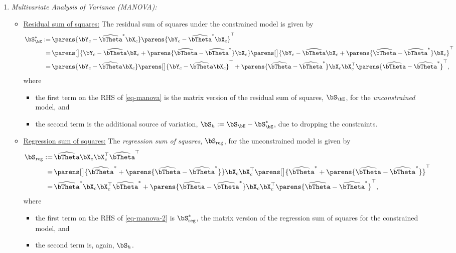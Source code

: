 \documentclass[12pt]{article}
\begin{document}
\begin{enumerate}[label=\textbf{\arabic*.}]
\begin{enumerate}
		\item \textit{Multivariate Analysis of Variance (MANOVA):} 
		\begin{itemize}
			\item \underline{Residual sum of squares:} The residual sum of squares under the constrained model is given by 
			\begin{align}
				\bS_{\bE}^* := & \, \parens{\bY_c - \widehat{\bTheta}^* \bX_c} \parens{\bY_c - \widehat{\bTheta}^* \bX_c}^\top \nonumber \\ 
				= & \, \parens[\big]{\bY_c - \widehat{\bTheta} \bX_c + \parens{\widehat{\bTheta} - \widehat{\bTheta}^*} \bX_c} \parens[\big]{\bY_c - \widehat{\bTheta} \bX_c + \parens{\widehat{\bTheta} - \widehat{\bTheta}^*} \bX_c}^\top \nonumber \\
				= & \, \parens{\bY_c - \widehat{\bTheta} \bX_c} \parens[\big]{\bY_c - \widehat{\bTheta} \bX_c}^\top + \parens{\widehat{\bTheta} - \widehat{\bTheta}^*} \bX_c \bX_c^\top \parens{\widehat{\bTheta} - \widehat{\bTheta}^*}^\top, \label{eq-manova}
			\end{align}
			where 
			\begin{itemize}
				\item the first term on the RHS of \eqref{eq-manova} is the matrix version of the residual sum of squares, $\bS_{\bE}$, for the \emph{unconstrained} model, and 
				\item the second term is the additional source of variation, $\bS_h := \bS_{\bE} - \bS_{\bE}^*$, due to dropping the constraints. 
			\end{itemize}
			
			\item \underline{Regression sum of squares:} The \emph{regression sum of squares}, $\bS_{\mathrm{reg}}$, for the unconstrained model is given by 
			\begin{align}
				\bS_{\mathrm{reg}} := & \, \widehat{\bTheta} \bX_c \bX_c^\top \widehat{\bTheta}^\top \nonumber \\ 
				= & \, \parens[\big]{\widehat{\bTheta}^* + \parens{\widehat{\bTheta} - \widehat{\bTheta}^*}} \bX_c \bX_c^\top \parens[\big]{\widehat{\bTheta}^* + \parens{\widehat{\bTheta} - \widehat{\bTheta}^*}}^\top \nonumber \\ 
				= & \, \widehat{\bTheta}^* \bX_c \bX_c^\top \widehat{\bTheta}^*  + \parens{\widehat{\bTheta} - \widehat{\bTheta}^*} \bX_c \bX_c^\top \parens{\widehat{\bTheta} - \widehat{\bTheta}^*}^\top, \label{eq-manova-2}
			\end{align}
			where 
			\begin{itemize}
				\item the first term on the RHS of \eqref{eq-manova-2} is $\bS_{\mathrm{reg}}^*$, the matrix version of the regression sum of squares for the constrained model, and 
				\item the second term is, again, $\bS_h$. 
			\end{itemize}
			

\end{itemize}
\end{enumerate}
\end{enumerate}
\end{document}
